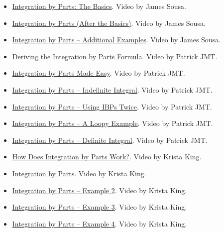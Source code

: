 \begin{itemize}

\item \href{https://youtu.be/815s-YB9X44}{Integration by Parts: The Basics}.  
Video by James Sousa.

\item \href{https://youtu.be/hfJ1zPizj_s}{Integration by Parts (After the Basics)}.  
Video by James Sousa.

\item \href{https://youtu.be/_kJNhoTJ4D4}{Integration by Parts – Additional Examples}.  
Video by James Sousa.

\item \href{https://youtu.be/q_BP4LyvdOA}{Deriving the Integration by Parts Formula}.  
Video by Patrick JMT.

\item \href{https://youtu.be/dqaDSlYdRcs}{Integration by Parts Made Easy}.  
Video by Patrick JMT.

\item \href{https://youtu.be/97RasvYIvl4}{Integration by Parts – Indefinite Integral}.  
Video by Patrick JMT.

\item \href{https://youtu.be/_MuKOm8IHBA}{Integration by Parts – Using IBPs Twice}.  
Video by Patrick JMT.

\item \href{https://youtu.be/L8HoALsls-E}{Integration by Parts – A Loopy Example}.  
Video by Patrick JMT.

\item \href{https://youtu.be/zGGI4PkHzhI}{Integration by Parts – Definite Integral}.  
Video by Patrick JMT.

\item \href{https://youtu.be/Eb5EDMHDnx8}{How Does Integration by Parts Work?}.  
Video by Krista King.

\item \href{https://youtu.be/SlBp9hZBqaQ}{Integration by Parts}.  
Video by Krista King.

\item \href{https://youtu.be/s8l1vs4gjtY}{Integration by Parts – Example 2}.  
Video by Krista King.

\item \href{https://youtu.be/0clmZGVl0ss}{Integration by Parts – Example 3}.  
Video by Krista King.

\item \href{https://youtu.be/CxV5HE6chSY}{Integration by Parts – Example 4}.  
Video by Krista King.

\end{itemize}

